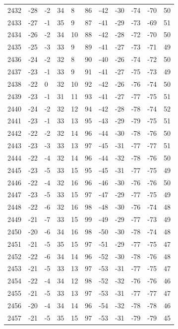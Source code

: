 \begin{table}[H]
\begin{tabular}{lllllllllll}
2432 & -28 & -2 & 34 & 8 & 86 & -42 & -30 & -74 & -70 & 50 \\
2433 & -27 & -1 & 35 & 9 & 87 & -41 & -29 & -73 & -69 & 51 \\
2434 & -26 & -2 & 34 & 10 & 88 & -42 & -28 & -72 & -70 & 50 \\
2435 & -25 & -3 & 33 & 9 & 89 & -41 & -27 & -73 & -71 & 49 \\
2436 & -24 & -2 & 32 & 8 & 90 & -40 & -26 & -74 & -72 & 50 \\
2437 & -23 & -1 & 33 & 9 & 91 & -41 & -27 & -75 & -73 & 49 \\
2438 & -22 & 0 & 32 & 10 & 92 & -42 & -26 & -76 & -74 & 50 \\
2439 & -23 & -1 & 31 & 11 & 93 & -41 & -27 & -77 & -75 & 51 \\
2440 & -24 & -2 & 32 & 12 & 94 & -42 & -28 & -78 & -74 & 52 \\
2441 & -23 & -1 & 33 & 13 & 95 & -43 & -29 & -79 & -75 & 51 \\
2442 & -22 & -2 & 32 & 14 & 96 & -44 & -30 & -78 & -76 & 50 \\
2443 & -23 & -3 & 33 & 13 & 97 & -45 & -31 & -77 & -77 & 51 \\
2444 & -22 & -4 & 32 & 14 & 96 & -44 & -32 & -78 & -76 & 50 \\
2445 & -23 & -5 & 33 & 15 & 95 & -45 & -31 & -77 & -75 & 49 \\
2446 & -22 & -4 & 32 & 16 & 96 & -46 & -30 & -76 & -76 & 50 \\
2447 & -23 & -5 & 33 & 15 & 97 & -47 & -29 & -77 & -75 & 49 \\
2448 & -22 & -6 & 32 & 16 & 98 & -48 & -30 & -76 & -74 & 48 \\
2449 & -21 & -7 & 33 & 15 & 99 & -49 & -29 & -77 & -73 & 49 \\
2450 & -20 & -6 & 34 & 16 & 98 & -50 & -30 & -78 & -74 & 48 \\
2451 & -21 & -5 & 35 & 15 & 97 & -51 & -29 & -77 & -75 & 47 \\
2452 & -22 & -6 & 34 & 14 & 96 & -52 & -30 & -78 & -76 & 48 \\
2453 & -21 & -5 & 33 & 13 & 97 & -53 & -31 & -77 & -75 & 47 \\
2454 & -22 & -4 & 34 & 12 & 98 & -52 & -32 & -76 & -76 & 46 \\
2455 & -21 & -5 & 33 & 13 & 97 & -53 & -31 & -77 & -77 & 47 \\
2456 & -20 & -4 & 34 & 14 & 96 & -54 & -32 & -78 & -78 & 46 \\
2457 & -21 & -5 & 35 & 15 & 97 & -53 & -31 & -79 & -79 & 45 \\

\end{tabular}
\end{table}

